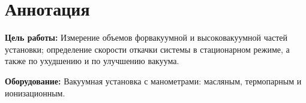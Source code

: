 \section{Аннотация}
\textbf{Цель работы:} Измерение объемов форвакуумной и высоковакуумной частей установки;
определение скорости откачки системы в стационарном режиме, а также по ухудшению и по
улучшению вакуума.

\textbf{Оборудование:} Вакуумная установка с манометрами: масляным, термопарным и
ионизационным.
